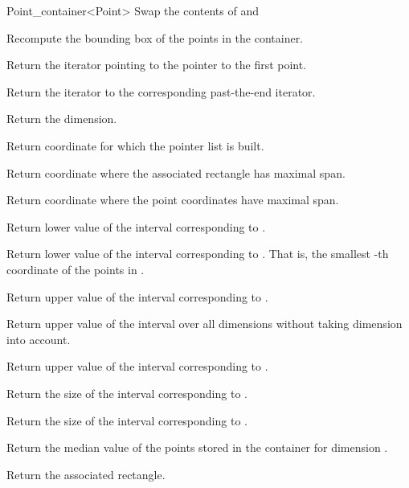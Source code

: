 \begin{ccRefClass}{Point_container<Point>}
{Swap the contents of  and }


{Recompute the bounding box of the points in the container.}


{
Return the iterator pointing to the pointer to the first point.
}

{
Return the iterator to the corresponding past-the-end iterator.
}

{
Return the dimension.
}

{
Return coordinate for which the pointer list is built.
}

{
Return coordinate where the associated rectangle has maximal span.
}

{
Return coordinate where the point coordinates have maximal span.
}

{
Return lower value of the interval corresponding to
.
}


{
Return lower value of the interval corresponding to
. That is, the smallest
-th coordinate of the points in
.
}


{
Return upper value of the interval corresponding to
.
}

{
Return upper value of the interval over all dimensions
without taking dimension  into account.
}

{
Return upper value of the interval corresponding to
.
}

{
Return the size of the interval corresponding to .
}

{
Return the size of the interval corresponding to .
}

{
Return the median value of the points stored in the container for
dimension .
}

{Return the associated rectangle.}


\end{ccRefClass}
